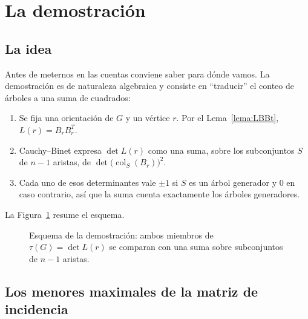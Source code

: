 \documentclass[12pt,a4paper]{article}
\theoremstyle{profesional}
\theoremstyle{definicion-style}
\theoremstyle{observacion-style}
\newcommand{\colS}[2]{\operatorname{col}_{#2}(#1)}
\begin{document}
\newpage
\section{La demostración}\label{sec:demo}

\subsection{La idea}

Antes de meternos en las cuentas conviene saber para dónde vamos. La demostración es de naturaleza algebraica y consiste en ``traducir'' el conteo de árboles a una suma de cuadrados:
\begin{enumerate}[label=\arabic*.]
    \item Se fija una orientación de \( G \) y un vértice \( r \). Por el Lema~\ref{lema:LBBt}, \( L(r) = B_r B_r^{T} \).
    \item Cauchy--Binet expresa \( \det L(r) \) como una suma, sobre los subconjuntos \( S \) de \( n - 1 \) aristas, de \( \det\big(\colS{B_r}{S}\big)^2 \).
    \item Cada uno de esos determinantes vale \( \pm 1 \) si \( S \) es un árbol generador y \( 0 \) en caso contrario, así que la suma cuenta exactamente los árboles generadores.
\end{enumerate}
La Figura~\ref{fig:idea} resume el esquema.

\begin{figure}[ht]
    \centering
    \caption{Esquema de la demostración: ambos miembros de \( \tau(G) = \det L(r) \) se comparan con una suma sobre subconjuntos de \( n - 1 \) aristas.}\label{fig:idea}
\end{figure}

\subsection{Los menores maximales de la matriz de incidencia}
\end{document}
